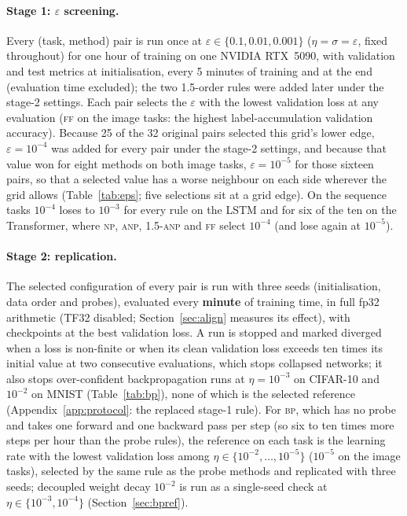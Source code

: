 \documentclass{article}
\newcommand{\method}[1]{\textsc{#1}}
\newcommand{\BP}{\method{bp}}
\newcommand{\NP}{\method{np}}
\newcommand{\ANP}{\method{anp}}
\newcommand{\ANPb}{\method{1.5-anp}}
\newcommand{\FF}{\method{ff}}
\begin{document}
\paragraph{Stage 1: $\varepsilon$ screening.}
Every (task, method) pair is run once at $\varepsilon\in\{0.1,0.01,0.001\}$
($\eta=\sigma=\varepsilon$, fixed throughout) for one hour of training on one NVIDIA
RTX~5090, with validation and test metrics at initialisation, every 5 minutes of
training and at the end (evaluation time excluded); the two 1.5-order rules were
added later under the stage-2 settings. Each pair selects the $\varepsilon$ with the
lowest validation loss at any evaluation (\FF{} on the image tasks: the highest
label-accumulation validation accuracy). Because 25 of the 32
original pairs selected this grid's lower edge, $\varepsilon=10^{-4}$ was added for
every pair under the stage-2 settings, and because that value won for eight methods on
both image tasks, $\varepsilon=10^{-5}$ for those sixteen pairs, so that a selected value has a worse
neighbour on each side wherever the grid allows (Table~\ref{tab:eps}; five
selections sit at a grid edge). On the sequence tasks $10^{-4}$ loses to $10^{-3}$ for
every rule on the LSTM and for six of the ten on the Transformer, where \NP{}, \ANP{},
\ANPb{} and \FF{} select $10^{-4}$ (and lose again at $10^{-5}$).

\paragraph{Stage 2: replication.}
The selected configuration of every pair is run with three seeds (initialisation, data
order and probes), evaluated every \textbf{minute} of training time, in full fp32
arithmetic (TF32 disabled; Section~\ref{sec:align} measures its effect), with
checkpoints at the best validation loss. A run is stopped and marked diverged when a
loss is non-finite or when its clean validation loss exceeds ten times its initial
value at two consecutive evaluations, which stops collapsed networks; it also stops
over-confident backpropagation runs at $\eta=10^{-3}$ on CIFAR-10 and $10^{-2}$ on MNIST
(Table~\ref{tab:bp}), none of which is the selected reference
(Appendix~\ref{app:protocol}: the replaced stage-1 rule). For \BP{}, which has no probe and takes one forward and one backward pass per step
(so six to ten times more steps per hour than the probe rules), the
reference on each task is the learning rate with the lowest validation loss among
$\eta\in\{10^{-2},\dots,10^{-5}\}$ ($10^{-5}$ on the image tasks), selected by the same rule as the probe methods and
replicated with three seeds; decoupled weight decay $10^{-2}$ \citep{loshchilov2019} is
run as a single-seed check at $\eta\in\{10^{-3},10^{-4}\}$ (Section~\ref{sec:bpref}).
\end{document}
